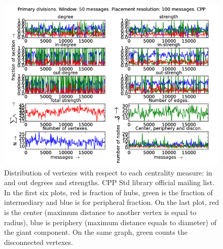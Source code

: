 \documentclass[%
 aip,
 jmp,%
 amsmath,amssymb,
 reprint,%
]{revtex4-1}
\begin{document}
\begin{figure}[hbtp] 
   \centering
        \includegraphics[width=\textwidth]{figs/CPP/50}
    \caption{Distribution of vertexes with respect to each centrality measure: in and out degrees and strengths. CPP Std library official mailing list. In the first six plots, red is fraction of hubs, green is the fraction of intermediary and blue is for peripheral fraction. On the last plot, red is the center (maximum distance to another vertex is equal to radius), blue is periphery (maximum distance equals to diameter) of the giant component. On the same graph, green counts the disconnected vertexes.}
    \label{fig:cpp50}
\end{figure}
\end{document}
